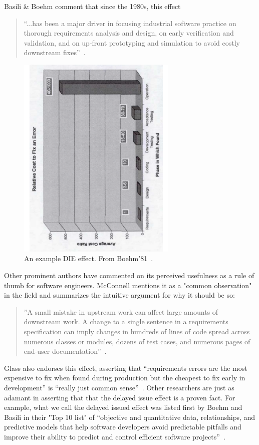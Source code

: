 \documentclass{sig-alternate}
\begin{document}
 Basili \& Boehm comment that since the 1980s,  this effect
 \begin{quote}
``...has been a major driver in focusing
industrial software practice on thorough
requirements analysis and design,
on early verification and validation, and
on up-front prototyping and simulation
to avoid costly downstream fixes''~\cite{boehm01}.
\end{quote}
 \begin{figure}[!b]  
\begin{center}
\includegraphics[angle=270,width=3in]{img/b81.pdf}
 \end{center}
 \caption{An example DIE effect. From Boehm'81~\cite{Boehm81}. }\label{fig:b81}
 \end{figure}
Other prominent authors have commented on its perceived usefulness as a rule of thumb for software engineers.  McConnell mentions it as a "common observation" in the field and  summarizes the intuitive argument for why it should be so: 
\begin{quote}
''A small mistake in upstream work can affect large amounts of downstream work. A change to a single sentence in a requirements specification can imply changes in hundreds of lines of code spread across numerous classes or modules, dozens of test cases, and numerous pages of end-user documentation''~\cite{mcconnell01}. 
\end{quote}
Glass also endorses this effect, asserting that ``requirements errors are the most expensive to fix when found during production but the cheapest to fix early in development'' is ``really just common sense''~\cite{glass02}.  Other researchers
are just as adamant in asserting that that the delayed issue effect is a proven
fact.
For example, what we call the delayed issued effect was listed first by Boehm and Basili in their "Top 10 list" of ``objective and quantitative data, relationships,
and predictive models that help
software developers avoid predictable pitfalls
and improve their ability to predict
and control efficient software projects''~\cite{boehm01}.
 
\end{document}
